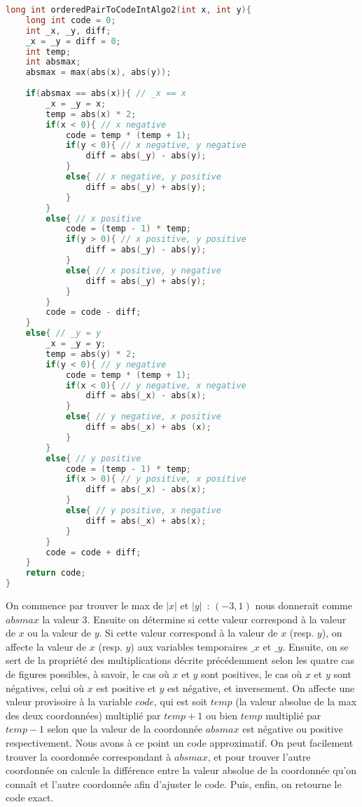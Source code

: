 \documentclass{article}
\begin{document}
\begin{lstlisting}[language=C]
long int orderedPairToCodeIntAlgo2(int x, int y){
	long int code = 0;
	int _x, _y, diff;
	_x = _y = diff = 0;
	int temp;
	int absmax;	
	absmax = max(abs(x), abs(y));	
	
	if(absmax == abs(x)){ // _x == x 
		_x = _y = x;
		temp = abs(x) * 2;
		if(x < 0){ // x negative
			code = temp * (temp + 1);
			if(y < 0){ // x negative, y negative
				diff = abs(_y) - abs(y);
			}
			else{ // x negative, y positive
				diff = abs(_y) + abs(y);
			}
		}
		else{ // x positive
			code = (temp - 1) * temp; 
			if(y > 0){ // x positive, y positive
				diff = abs(_y) - abs(y);
			}
			else{ // x positive, y negative
				diff = abs(_y) + abs(y);
			}
		}
		code = code - diff;
	}
	else{ // _y = y
		_x = _y = y;
		temp = abs(y) * 2;
		if(y < 0){ // y negative
			code = temp * (temp + 1);		
			if(x < 0){ // y negative, x negative
				diff = abs(_x) - abs(x);
			}
			else{ // y negative, x positive
				diff = abs(_x) + abs (x);
			}
		}
		else{ // y positive
			code = (temp - 1) * temp;
			if(x > 0){ // y positive, x positive
				diff = abs(_x) - abs(x);
			}
			else{ // y positive, x negative
				diff = abs(_x) + abs(x);
			}	
		}	
		code = code + diff;	
	}
	return code;
}
\end{lstlisting}


On commence par trouver le max de $|x|$ et $|y|$~: $(-3,1)$ nous donnerait comme $absmax$ la valeur $3$. Ensuite on détermine si cette valeur correspond à la valeur de $x$ ou la valeur de $y$. Si cette valeur correspond à la valeur de $x$ (resp. $y$), on affecte la valeur de $x$ (resp. $y$) aux variables temporaires $\_x$ et $\_y$. Ensuite, on se sert de la propriété des multiplications décrite précédemment selon les quatre cas de figures possibles, à savoir, le cas où $x$ et $y$ sont positives, le cas où $x$ et $y$ sont négatives, celui où $x$ est positive et $y$ est négative, et inversement. On affecte une valeur provisoire à la variable $code$, qui est soit $temp$ (la valeur absolue de la max des deux coordonnées) multiplié par $temp + 1$ ou bien $temp$ multiplié par $temp - 1$ selon que la valeur de la coordonnée $absmax$ est négative ou positive respectivement. Nous avons à ce point un code approximatif. On peut facilement trouver la coordonnée correspondant à $absmax$, et pour trouver l'autre coordonnée on calcule la différence entre la valeur absolue de la coordonnée qu'on connaît et l'autre coordonnée afin d'ajuster le code. Puis, enfin, on retourne le code exact.
\end{document}
